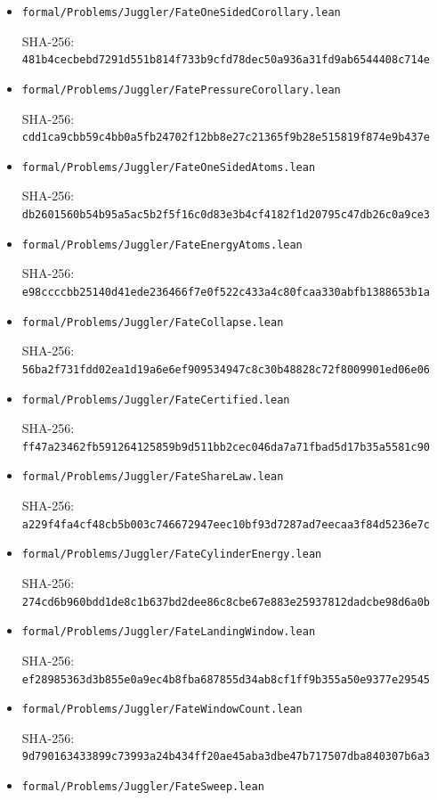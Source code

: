 \documentclass[11pt,a4paper]{article}
\begin{document}
\begin{itemize}
  SHA-256:
  \texttt{\nolinkurl{7ae0aa4cab061a24ef51eff381a0f4bbd4e4569ae2578f04e4c3677b5999bddc}}
\item
  \texttt{\nolinkurl{formal/Problems/Juggler/FateOneSidedCorollary.lean}}

  SHA-256:
  \texttt{\nolinkurl{481b4cecbebd7291d551b814f733b9cfd78dec50a936a31fd9ab6544408c714e}}
\item
  \texttt{\nolinkurl{formal/Problems/Juggler/FatePressureCorollary.lean}}

  SHA-256:
  \texttt{\nolinkurl{cdd1ca9cbb59c4bb0a5fb24702f12bb8e27c21365f9b28e515819f874e9b437e}}
\item
  \texttt{\nolinkurl{formal/Problems/Juggler/FateOneSidedAtoms.lean}}

  SHA-256:
  \texttt{\nolinkurl{db2601560b54b95a5ac5b2f5f16c0d83e3b4cf4182f1d20795c47db26c0a9ce3}}
\item
  \texttt{\nolinkurl{formal/Problems/Juggler/FateEnergyAtoms.lean}}

  SHA-256:
  \texttt{\nolinkurl{e98ccccbb25140d41ede236466f7e0f522c433a4c80fcaa330abfb1388653b1a}}
\item
  \texttt{\nolinkurl{formal/Problems/Juggler/FateCollapse.lean}}

  SHA-256:
  \texttt{\nolinkurl{56ba2f731fdd02ea1d19a6e6ef909534947c8c30b48828c72f8009901ed06e06}}
\item
  \texttt{\nolinkurl{formal/Problems/Juggler/FateCertified.lean}}

  SHA-256:
  \texttt{\nolinkurl{ff47a23462fb591264125859b9d511bb2cec046da7a71fbad5d17b35a5581c90}}
\item
  \texttt{\nolinkurl{formal/Problems/Juggler/FateShareLaw.lean}}

  SHA-256:
  \texttt{\nolinkurl{a229f4fa4cf48cb5b003c746672947eec10bf93d7287ad7eecaa3f84d5236e7c}}
\item
  \texttt{\nolinkurl{formal/Problems/Juggler/FateCylinderEnergy.lean}}

  SHA-256:
  \texttt{\nolinkurl{274cd6b960bdd1de8c1b637bd2dee86c8cbe67e883e25937812dadcbe98d6a0b}}
\item
  \texttt{\nolinkurl{formal/Problems/Juggler/FateLandingWindow.lean}}

  SHA-256:
  \texttt{\nolinkurl{ef28985363d3b855e0a9ec4b8fba687855d34ab8cf1ff9b355a50e9377e29545}}
\item
  \texttt{\nolinkurl{formal/Problems/Juggler/FateWindowCount.lean}}

  SHA-256:
  \texttt{\nolinkurl{9d790163433899c73993a24b434ff20ae45aba3dbe47b717507dba840307b6a3}}
\item
  \texttt{\nolinkurl{formal/Problems/Juggler/FateSweep.lean}}


\end{itemize}
\end{document}
